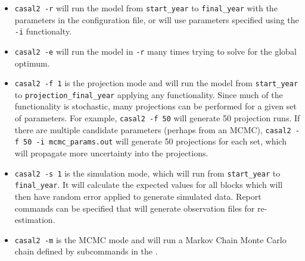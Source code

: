 \begin{itemize}
	
	\item \texttt{casal2 -r} will run the model from \texttt{start\_year} to \texttt{final\_year} with the parameters in the configuration file, or will use parameters specified using the \texttt{-i} functionalty.
	
	\item \texttt{casal2 -e} will run the model in \texttt{-r} many times trying to solve for the global optimum.
	
	\item \texttt{casal2 -f 1} is the projection mode and will run the model from \texttt{start\_year} to \texttt{projection\_final\_year} applying any  functionality. Since much of the  functionality is stochastic, many projections can be performed for a given set of parameters. For example, \texttt{casal2 -f 50} will generate 50 projection runs. If there are multiple candidate parameters (perhaps from an MCMC), \texttt{casal2 -f 50 -i mcmc\_params.out} will generate 50 projections for each set, which will propagate more uncertainty into the projections.
	
	\item \texttt{casal2 -s 1} is the simulation mode, which will run from \texttt{start\_year} to \texttt{final\_year}. It will calculate the expected values for all  blocks which will then have random error applied to generate simulated data. Report commands can be specified that will generate observation files for re-estimation.
	
	\item \texttt{casal2 -m} is the MCMC mode and will run a Markov Chain Monte Carlo chain defined by subcommands in the .
\end{itemize}
